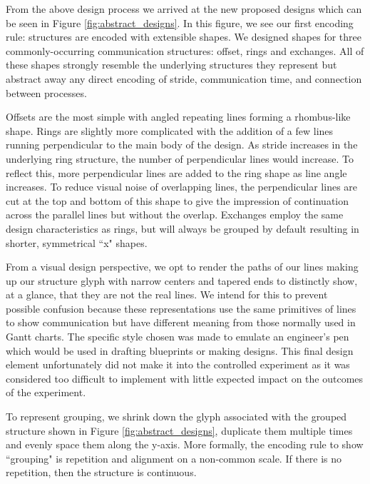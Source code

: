 From the above design process we arrived at the new proposed designs which can be seen in Figure \ref{fig:abstract_designs}. In this figure, we see our first encoding rule: structures are encoded with extensible shapes. We designed shapes for three commonly-occurring communication structures: offset, rings and exchanges. All of these shapes strongly resemble the underlying structures they represent but abstract away any direct encoding of stride, communication time, and connection between processes.

Offsets are the most simple with angled repeating lines forming a rhombus-like shape. Rings are slightly more complicated with the addition of a few lines running perpendicular to the main body of the design. As stride increases in the underlying ring structure, the number of perpendicular lines would increase. To reflect this, more perpendicular lines are added to the ring shape as line angle increases. To reduce visual noise of overlapping lines, the perpendicular lines are cut at the top and bottom of this shape to give the impression of continuation across the parallel lines but without the overlap. Exchanges employ the same design characteristics as rings, but will always be grouped by default resulting in shorter, symmetrical ``x" shapes. 

From a visual design perspective, we opt to render the paths of our lines making up our structure glyph with narrow centers and tapered ends to distinctly show, at a glance, that they are not the real lines. We intend for this to prevent possible confusion because these representations use the same primitives of lines to show communication but have different meaning from those normally used in Gantt charts. The specific style chosen was made to emulate an engineer's pen which would be used in drafting blueprints or making designs. This final design element unfortunately did not make it into the controlled experiment as it was considered too difficult to implement with little expected impact on the outcomes of the experiment.


To represent grouping, we shrink down the glyph associated with the grouped structure shown in Figure \ref{fig:abstract_designs}, duplicate them multiple times and evenly space them along the y-axis. More formally, the encoding rule to show ``grouping" is repetition and alignment on a non-common scale. If there is no repetition, then the structure is continuous.


